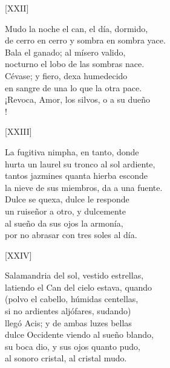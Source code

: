 \documentclass[11pt,a4paper,twoside]{article}
\begin{document}
%
\begin{center}
	[XXII]
\end{center}\pstart
Mudo la noche el can, el día, dormido,\\
de cerro en cerro y sombra en sombra yace.\\
Bala el ganado; al mísero valido,\\
nocturno el lobo de las sombras nace.\\
Cévase; y fiero, dexa humedecido\\
en sangre de una lo que la otra pace.\\
¡Revoca, Amor, los silvos, o a su dueño\\
!\par\pend
%
\begin{center}
	[XXIII]
\end{center}\pstart
La fugitiva nimpha, en tanto, donde\\
hurta un laurel su tronco al sol ardiente,\\
tantos jazmines quanta hierba esconde\\
la nieve de sus miembros, da a una fuente.\\
Dulce se quexa, dulce le responde\\
un ruiseñor a otro, y dulcemente\\
al sueño da sus ojos la armonía,\\
por no abrasar con tres soles al día.\par\pend
\relax
\vfill
\newpage
%
\begin{center}
	[XXIV]
\end{center}\pstart
Salamandria del sol, vestido estrellas,\\
latiendo el Can del cielo estava, quando\\
(polvo el cabello, húmidas centellas,\\
si no ardientes aljófares, sudando)\\
llegó Acis; y de ambas luzes bellas\\
dulce Occidente viendo al sueño blando,\\
su boca dio, y sus ojos quanto pudo,\\
al sonoro cristal, al cristal mudo.\par\pend
\end{document}
